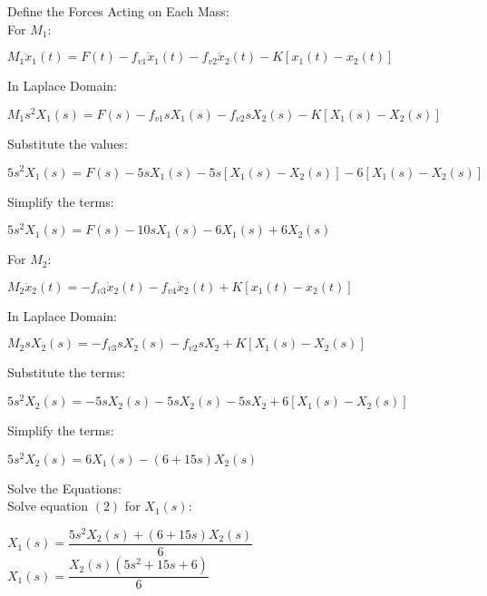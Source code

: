 \documentclass[11pt,letterpaper]{article}
\begin{document}
Define the Forces Acting on Each Mass:\\[12pt]
For $M_1$:\\[12pt]
\begin{center}
	$M_1\ddot{x}_1(t)=F(t)-f_{v1}\dot{x}_1(t)-f_{v2}\dot{x}_2(t)-K[x_1(t)-x_2(t)]$\\
\end{center}
In Laplace Domain:\\
\begin{center}
	$M_1s^2X_1(s)=F(s)-f_{v1}sX_1(s)-f_{v2}sX_2(s)-K[X_1(s)-X_2(s)]$\\
\end{center}
Substitute the values:\\
\begin{center}
	$5s^2X_1(s)=F(s)-5sX_1(s)-5s[X_1(s)-X_2(s)]-6[X_1(s)-X_2(s)]$\\
\end{center}
Simplify the terms:\\
\begin{center}
	$5s^2X_1(s)=F(s)-10sX_1(s)-6X_1(s)+6X_2(s)$\\
\end{center}
For $M_2$:\\[12pt]
\begin{center}
	$M_2\ddot{x}_2(t)=-f_{v3}\dot{x}_2(t)-f_{v4}\dot{x}_2(t)+K[x_1(t)-x_2(t)]$\\
\end{center}
In Laplace Domain:\\
\begin{center}
	$M_2sX_2(s)=-f_{v3}sX_2(s)-f_{v2}sX_2+K[X_1(s)-X_2(s)]$\\
\end{center}
Substitute the terms:\\
\begin{center}
	$5s^2X_2(s)=-5sX_2(s)-5sX_2(s)-5sX_2+6[X_1(s)-X_2(s)]$\\
\end{center}
Simplify the terms:\\
\begin{center}
	$5s^2X_2(s)=6X_1(s)-(6+15s)X_2(s)$\\
\end{center}
Solve the Equations:\\[12pt]
Solve equation $(2)$ for $X_1(s)$:\\
\begin{center}
	$X_1(s)=\dfrac{5s^2X_2(s)+(6+15s)X_2(s)}{6}$\\[12pt]
	$X_1(s)=\dfrac{X_2(s)(5s^2+15s+6)}{6}$\\[12pt]
\end{center}
\end{document}
